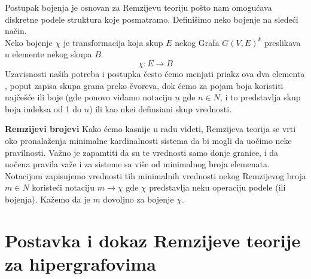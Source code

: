 \documentclass[a4paper]{article}
\begin{document}
\begin{description}
		Postupak bojenja je osnovan za Remzijevu teoriju pošto nam omogućava diskretne podele struktura koje posmatramo. Definišimo neko bojenje na sledeći način. \\
		Neko bojenje $\chi$ je transformacija koja skup $E$ nekog Grafa $G(V,E)^k$ preslikava u elemente nekog skupa $B$.
		\[ 
			\chi : E \rightarrow B
		 \] 
		 Uzavisnosti naših potreba i postupka često ćemo menjati priakz ova dva elementa , poput zapisa skupa grana preko čvoreva, dok ćemo za pojam boja koristiti najčešće ili boje (gde ponovo viđamo notaciju $\underline{n}$ gde $n \in N$, i to predstavlja skup boja indeksa od 1 do $n$) ili kao nkei definsiani skup vrednosti. %
		\item \textbf{Remzijevi brojevi}
		Kako ćemo kasnije u radu videti, Remzijeva teorija se vrti oko pronalaženja minimalne kardinalnosti sistema da bi mogli da uočimo neke pravilnosti. Važno je zapamtiti da su te vrednosti samo donje granice, i da uočena pravila važe i za sisteme sa više od minimalnog broja elemenata. Notacijom zapisujemo vrednosti tih minimalnih vrednosti nekog Remzijevog broja $m \in N$ koristeći notaciju $m \rightarrow \chi$ gde $\chi$ predstavlja neku operaciju podele (ili bojenja). Kažemo da je $m$ dovoljno za bojenje $\chi$.
	\end{description}
	
	\section{Postavka i dokaz Remzijeve teorije za hipergrafovima}
\end{document}
